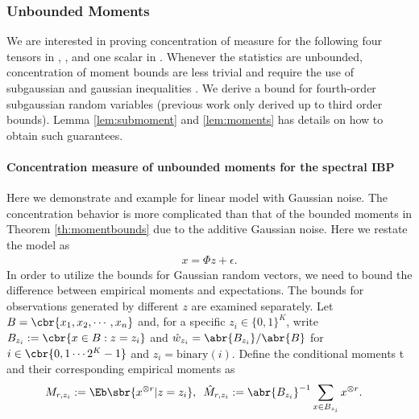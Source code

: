 \documentclass[twoside,11pt]{article}
\begin{document}
{\subsubsection{Unbounded Moments}
We are interested in proving concentration of measure for the following four tensors in , ,
 and one scalar in
. Whenever the statistics are unbounded,
concentration of moment bounds are less trivial and require the use of
subgaussian and gaussian inequalities \citep{HsuKakZha09}. We derive a
bound for fourth-order subgaussian random variables (previous work
only derived up to third order bounds). Lemma \ref{lem:submoment} and
\ref{lem:moments} has details on how to obtain such guarantees. 

\paragraph{Concentration measure of unbounded moments for the spectral IBP}
 Here we demonstrate and example for linear model with Gaussian noise. The concentration behavior is more complicated than that of the bounded moments in Theorem \ref{th:momentbounds} due to the additive Gaussian noise. Here we restate the model as
  \begin{align}
    x= \Phi z + \epsilon.
  \end{align}
In order to utilize the bounds for Gaussian random vectors, we need to bound the difference between empirical moments and expectations. The bounds for observations generated by different $z$ are examined separately. Let $B = \cbr{x_1, x_2, \cdots, x_n}$ and, for a specific $z_i \in \{0,1\}^K$, write $B_{z_i} := \cbr{x \in B: z = z_i}$ and $\hat{w}_{z_i} = \abr{B_{z_i}}/\abr{B}$ for $i \in \cbr{0,1 \cdots 2^K-1}$ and $z_i = \mathrm{binary} (i)$. Define the conditional moments t and their corresponding empirical moments as
  \begin{align}
    M_{r, z_i} &:= \Eb \sbr{x^{\otimes r} | z = z_i}, \,\,\, \hat{M}_{r, z_i} := \abr{B_{z_i}}^{-1} \sum \limits_{x \in B_{z_i}} x^{\otimes r}.
    \end{align}

}
\end{document}
